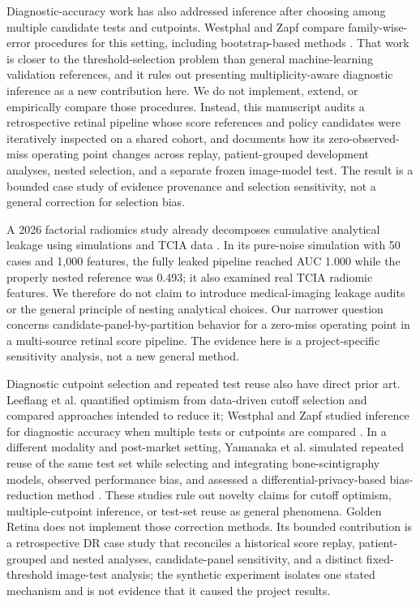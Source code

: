 \documentclass{ieeeaccess}
\begin{document}
Diagnostic-accuracy work has also addressed inference after choosing among multiple candidate tests and cutpoints. Westphal and Zapf compare family-wise-error procedures for this setting, including bootstrap-based methods \cite{westphal2024}. That work is closer to the threshold-selection problem than general machine-learning validation references, and it rules out presenting multiplicity-aware diagnostic inference as a new contribution here. We do not implement, extend, or empirically compare those procedures. Instead, this manuscript audits a retrospective retinal pipeline whose score references and policy candidates were iteratively inspected on a shared cohort, and documents how its zero-observed-miss operating point changes across replay, patient-grouped development analyses, nested selection, and a separate frozen image-model test. The result is a bounded case study of evidence provenance and selection sensitivity, not a general correction for selection bias.

A 2026 factorial radiomics study already decomposes cumulative analytical leakage using simulations and TCIA data \cite{garciahidalgo2026}. In its pure-noise simulation with 50 cases and 1,000 features, the fully leaked pipeline reached AUC 1.000 while the properly nested reference was 0.493; it also examined real TCIA radiomic features. We therefore do not claim to introduce medical-imaging leakage audits or the general principle of nesting analytical choices. Our narrower question concerns candidate-panel-by-partition behavior for a zero-miss operating point in a multi-source retinal score pipeline. The evidence here is a project-specific sensitivity analysis, not a new general method.

Diagnostic cutpoint selection and repeated test reuse also have direct prior art. Leeflang et al. quantified optimism from data-driven cutoff selection and compared approaches intended to reduce it; Westphal and Zapf studied inference for diagnostic accuracy when multiple tests or cutpoints are compared \cite{leeflang2008,westphal2024}. In a different modality and post-market setting, Yamanaka et al. simulated repeated reuse of the same test set while selecting and integrating bone-scintigraphy models, observed performance bias, and assessed a differential-privacy-based bias-reduction method \cite{yamanaka2026}. These studies rule out novelty claims for cutoff optimism, multiple-cutpoint inference, or test-set reuse as general phenomena. Golden Retina does not implement those correction methods. Its bounded contribution is a retrospective DR case study that reconciles a historical score replay, patient-grouped and nested analyses, candidate-panel sensitivity, and a distinct fixed-threshold image-test analysis; the synthetic experiment isolates one stated mechanism and is not evidence that it caused the project results.
\end{document}
